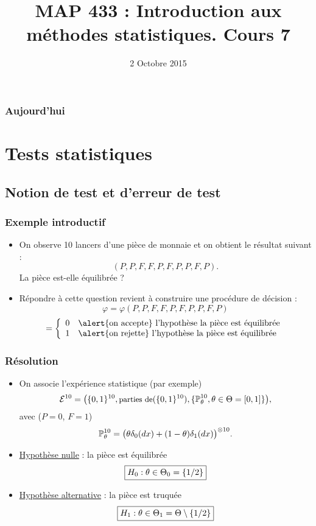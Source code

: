 



\title{MAP 433 : Introduction aux méthodes statistiques. Cours 7}


\date{2 Octobre 2015}
\maketitle



\begin{frame}
\frametitle{Aujourd'hui}
\tableofcontents
\end{frame}


\section{Tests statistiques}

\subsection{Notion de test et d'erreur de test}



\begin{frame}
\frametitle{Exemple introductif}
\begin{itemize}
\item On observe 10 lancers d'une pièce de monnaie et on obtient le résultat suivant :
$$(P, P, F, F, P, F, P, P, F, P).$$
\alert{La pièce est-elle équilibrée} ?
\item \alert{Répondre} à cette question revient à \alert{construire une procédure de décision} :
$$\varphi = \varphi(P, P, F, F, P, F, P, P, F, P)$$
$$ =
\left\{
\begin{array}{ll}
0 & \text{\alert{on accepte} l'hypothèse  la pièce est équilibrée} \\
1 & \text{\alert{on rejette} l'hypothèse  la pièce est équilibrée}
\end{array}
\right.$$
\end{itemize}
\end{frame}

\begin{frame}
\frametitle{Résolution}
\begin{itemize}
\item On associe l'expérience statistique (par exemple)
$${\mathcal E}^{10} = \big(\{0,1\}^{10}, \text{{\small parties de}}(\{0,1\}^{10}), \{\operatorname{{\mathbb P}}_\theta^{10}, \theta \in \Theta = [0,1]\}\big),$$
avec ($P=0$, $F=1$)
$$\operatorname{{\mathbb P}}^{10}_\theta=\big(\theta\delta_{0}(dx)+(1-\theta)\delta_{1}(dx)\big)^{\otimes 10}.$$
\item\underline{Hypothèse nulle} :  \alert{  la pièce est équilibrée }
$$\boxed{H_0: \theta \in \Theta_0 = \{ 1/2\} }$$
\item \underline{Hypothèse alternative} :  \alert{ la pièce est truquée}
$$\boxed{H_1 : \theta \in \Theta_1 = \Theta \setminus \{1/2\}}$$
\end{itemize}
\end{frame}

